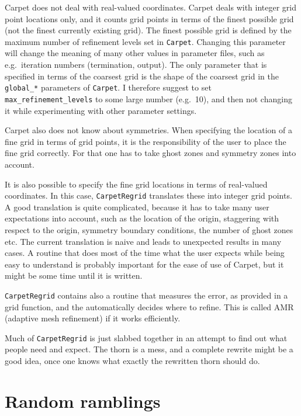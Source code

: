 \documentclass{article}
\begin{document}
   Carpet does not deal with real-valued coordinates.  Carpet deals
   with integer grid point locations only, and it counts grid points
   in terms of the finest possible grid (not the finest currently
   existing grid).  The finest possible grid is defined by the maximum
   number of refinement levels set in \texttt{Carpet}.  Changing this
   parameter will change the meaning of many other values in parameter
   files, such as e.g.\ iteration numbers (termination, output).  The
   only parameter that is specified in terms of the coarsest grid is
   the shape of the coarsest grid in the \texttt{global\_*} parameters
   of \texttt{Carpet}.  I therefore suggest to set
   \texttt{max\_refinement\_levels} to some large number (e.g.\ 10),
   and then not changing it while experimenting with other parameter
   settings.

   Carpet also does not know about symmetries.  When specifying the
   location of a fine grid in terms of grid points, it is the
   responsibility of the user to place the fine grid correctly.  For
   that one has to take ghost zones and symmetry zones into account.

   It is also possible to specify the fine grid locations in terms of
   real-valued coordinates.  In this case, \texttt{CarpetRegrid}
   translates these into integer grid points.  A good translation is
   quite complicated, because it has to take many user expectations
   into account, such as the location of the origin, staggering with
   respect to the origin, symmetry boundary conditions, the number of
   ghost zones etc.  The current translation is naive and leads to
   unexpected results in many cases.  A routine that does most of the
   time what the user expects while being easy to understand is
   probably important for the ease of use of Carpet, but it might be
   some time until it is written.

   \texttt{CarpetRegrid} contains also a routine that measures the
   error, as provided in a grid function, and the automatically
   decides where to refine.  This is called AMR (adaptive mesh
   refinement) if it works efficiently.

   Much of \texttt{CarpetRegrid} is just slabbed together in an
   attempt to find out what people need and expect.  The thorn is a
   mess, and a complete rewrite might be a good idea, once one knows
   what exactly the rewritten thorn should do.



\section{Random ramblings}
\end{document}
